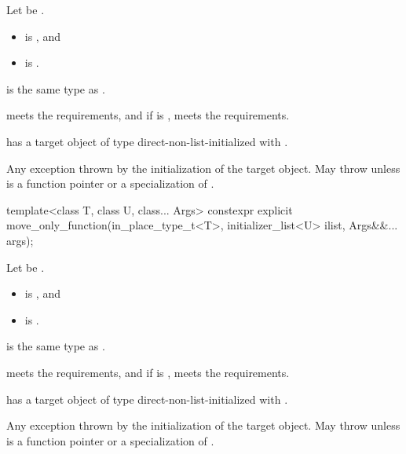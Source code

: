\begin{itemdescr}
\pnum
Let  be .

\pnum
\constraints
\begin{itemize}
\item {} is , and
\item {} is .
\end{itemize}

\pnum
\mandates
{} is the same type as .

\pnum
\expects
{} meets the  requirements, and if  is ,  meets the  requirements.

\pnum
\ensures
{} has a target object of type  direct-non-list-initialized with .

\pnum
\throws
Any exception thrown by the initialization of the target object. May throw  unless  is a function pointer or a specialization of .
\end{itemdescr}

%
\begin{itemdecl}
template<class T, class U, class... Args>
  constexpr explicit move_only_function(in_place_type_t<T>, initializer_list<U> ilist, Args&&... args);
\end{itemdecl}

\begin{itemdescr}
\pnum
Let  be .

\pnum
\constraints
\begin{itemize}
\item {} is , and
\item {} is .
\end{itemize}

\pnum
\mandates
{} is the same type as .

\pnum
\expects
{} meets the  requirements, and if  is ,  meets the  requirements.

\pnum
\ensures
{} has a target object of type  direct-non-list-initialized with .

\pnum
\throws
Any exception thrown by the initialization of the target object. May throw  unless  is a function pointer or a specialization of .
\end{itemdescr}

